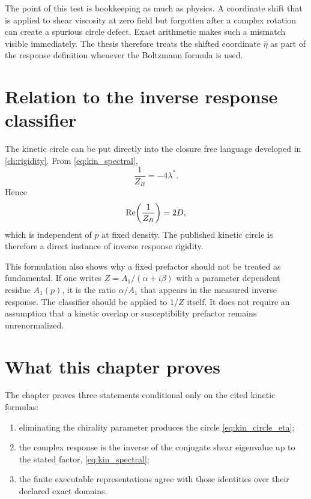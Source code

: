 The point of this test is bookkeeping as much as physics. A coordinate shift that is applied to shear viscosity at zero field but forgotten after a complex rotation can create a spurious circle defect. Exact arithmetic makes such a mismatch visible immediately. The thesis therefore treats the shifted coordinate $\bar\eta$ as part of the response definition whenever the Boltzmann formula is used.

\section{Relation to the inverse response classifier}
The kinetic circle can be put directly into the closure free language developed in \cref{ch:rigidity}. From \cref{eq:kin_spectral},
\begin{equation}
 \frac{1}{Z_B}=-4\lambda^*.
 \label{eq:kin_inverse_z}
\end{equation}
Hence
\begin{equation}
 \operatorname{Re}\!\left(\frac{1}{Z_B}\right)=2D,
 \label{eq:kin_inverse_real}
\end{equation}
which is independent of $p$ at fixed density. The published kinetic circle is therefore a direct instance of inverse response rigidity.

This formulation also shows why a fixed prefactor should not be treated as fundamental. If one writes $Z=A_1/(\alpha+i\beta)$ with a parameter dependent residue $A_1(p)$, it is the ratio $\alpha/A_1$ that appears in the measured inverse response. The classifier should be applied to $1/Z$ itself. It does not require an assumption that a kinetic overlap or susceptibility prefactor remains unrenormalized.

\section{What this chapter proves}
The chapter proves three statements conditional only on the cited kinetic formulas:
\begin{enumerate}[label=\alph*)]
\item eliminating the chirality parameter produces the circle \cref{eq:kin_circle_eta};
\item the complex response is the inverse of the conjugate shear eigenvalue up to the stated factor, \cref{eq:kin_spectral};
\item the finite executable representations agree with those identities over their declared exact domains.
\end{enumerate}

